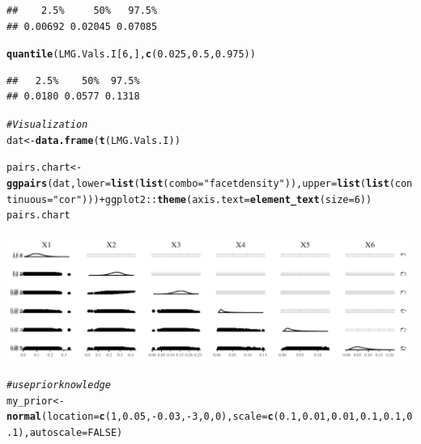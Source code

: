 \documentclass[11pt,a4paper,twoside]{book}\usepackage[]{graphicx}\usepackage[]{color}
\makeatletter
\newcommand{\hlnum}[1]{\textcolor[rgb]{0.686,0.059,0.569}{#1}}%
\newcommand{\hlstr}[1]{\textcolor[rgb]{0.192,0.494,0.8}{#1}}%
\newcommand{\hlcom}[1]{\textcolor[rgb]{0.678,0.584,0.686}{\textit{#1}}}%
\newcommand{\hlopt}[1]{\textcolor[rgb]{0,0,0}{#1}}%
\newcommand{\hlstd}[1]{\textcolor[rgb]{0.345,0.345,0.345}{#1}}%
\newcommand{\hlkwb}[1]{\textcolor[rgb]{0.69,0.353,0.396}{#1}}%
\newcommand{\hlkwc}[1]{\textcolor[rgb]{0.333,0.667,0.333}{#1}}%
\newcommand{\hlkwd}[1]{\textcolor[rgb]{0.737,0.353,0.396}{\textbf{#1}}}%
\newenvironment{kframe}{%
 \def\at@end@of@kframe{}%
 \ifinner\ifhmode%
  \def\at@end@of@kframe{\end{minipage}}%
  \begin{minipage}{\columnwidth}%
 \fi\fi%
 \def\FrameCommand##1{\hskip\@totalleftmargin \hskip-\fboxsep
 \colorbox{shadecolor}{##1}\hskip-\fboxsep
     \hskip-\linewidth \hskip-\@totalleftmargin \hskip\columnwidth}%
 \MakeFramed {\advance\hsize-\width
   \@totalleftmargin\z@ \linewidth\hsize
   \@setminipage}}%
 {\par\unskip\endMakeFramed%
 \at@end@of@kframe}
\newenvironment{knitrout}{}{} %
\makeatother
\begin{document}
\begin{knitrout}
\begin{kframe}
\begin{alltt}
\end{alltt}
\begin{verbatim}
##    2.5%     50%   97.5% 
## 0.00692 0.02045 0.07085
\end{verbatim}
\begin{alltt}
\hlkwd{quantile}\hlstd{(LMG.Vals.I[}\hlnum{6}\hlstd{,],} \hlkwd{c}\hlstd{(}\hlnum{0.025}\hlstd{,} \hlnum{0.5}\hlstd{,} \hlnum{0.975}\hlstd{))}
\end{alltt}
\begin{verbatim}
##   2.5%    50%  97.5% 
## 0.0180 0.0577 0.1318
\end{verbatim}
\begin{alltt}
\hlcom{#Visualization}
\hlstd{dat} \hlkwb{<-} \hlkwd{data.frame}\hlstd{(}\hlkwd{t}\hlstd{(LMG.Vals.I))}

\hlstd{pairs.chart} \hlkwb{<-} \hlkwd{ggpairs}\hlstd{(dat,} \hlkwc{lower} \hlstd{=} \hlkwd{list}\hlstd{(}\hlkwd{list}\hlstd{(}\hlkwc{combo} \hlstd{=} \hlstr{"facetdensity"}\hlstd{)),} \hlkwc{upper} \hlstd{=} \hlkwd{list}\hlstd{(}\hlkwd{list}\hlstd{(}\hlkwc{continuous} \hlstd{=} \hlstr{"cor"}\hlstd{)))} \hlopt{+} \hlstd{ggplot2}\hlopt{::}\hlkwd{theme}\hlstd{(}\hlkwc{axis.text} \hlstd{=} \hlkwd{element_text}\hlstd{(}\hlkwc{size} \hlstd{=} \hlnum{6}\hlstd{))}
\hlstd{pairs.chart}
\end{alltt}
\end{kframe}

{\centering \includegraphics[width=\textwidth-3cm]{figure/ch03_figreal_data_LMG-1} 

}


\begin{kframe}\begin{alltt}
\hlcom{#use prior knowledge}
\hlstd{my_prior} \hlkwb{<-} \hlkwd{normal}\hlstd{(}\hlkwc{location} \hlstd{=} \hlkwd{c}\hlstd{(}\hlnum{1}\hlstd{,} \hlnum{0.05}\hlstd{,}\hlopt{-}\hlnum{0.03}\hlstd{,}\hlopt{-}\hlnum{3}\hlstd{,} \hlnum{0}\hlstd{,} \hlnum{0}\hlstd{),} \hlkwc{scale} \hlstd{=} \hlkwd{c}\hlstd{(}\hlnum{0.1}\hlstd{,} \hlnum{0.01}\hlstd{,}\hlnum{0.01}\hlstd{,}\hlnum{0.1}\hlstd{,} \hlnum{0.1}\hlstd{,} \hlnum{0.1}\hlstd{),} \hlkwc{autoscale} \hlstd{=} \hlnum{FALSE}\hlstd{)}



\end{alltt}
\end{kframe}
\end{knitrout}
\end{document}
